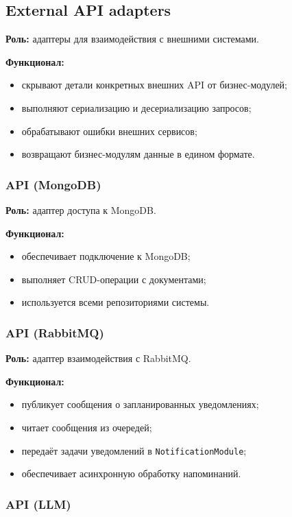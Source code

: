 \documentclass[10pt,a4paper,final]{article} %
\begin{document}
\subsection{External API adapters}

\textbf{Роль:} адаптеры для взаимодействия с внешними системами.

\textbf{Функционал:}
\begin{itemize}
    \item скрывают детали конкретных внешних API от бизнес-модулей;
    \item выполняют сериализацию и десериализацию запросов;
    \item обрабатывают ошибки внешних сервисов;
    \item возвращают бизнес-модулям данные в едином формате.
\end{itemize}

\subsubsection{API (MongoDB)}

\textbf{Роль:} адаптер доступа к MongoDB.

\textbf{Функционал:}
\begin{itemize}
    \item обеспечивает подключение к MongoDB;
    \item выполняет CRUD-операции с документами;
    \item используется всеми репозиториями системы.
\end{itemize}

\subsubsection{API (RabbitMQ)}

\textbf{Роль:} адаптер взаимодействия с RabbitMQ.

\textbf{Функционал:}
\begin{itemize}
    \item публикует сообщения о запланированных уведомлениях;
    \item читает сообщения из очередей;
    \item передаёт задачи уведомлений в \texttt{NotificationModule};
    \item обеспечивает асинхронную обработку напоминаний.
\end{itemize}

\subsubsection{API (LLM)}
\end{document}
